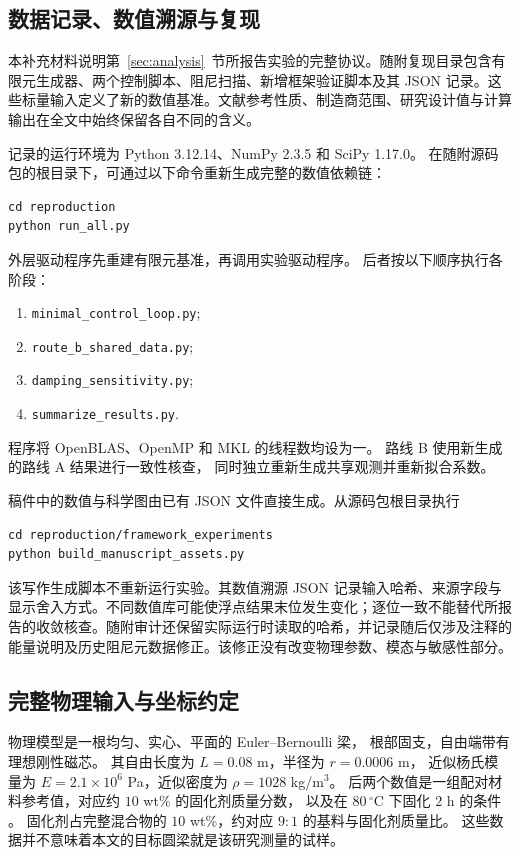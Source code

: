 \subsection{数据记录、数值溯源与复现}
\label{sx:records}
本补充材料说明第~\ref{sec:analysis}~节所报告实验的完整协议。随附复现目录包含有限元生成器、两个控制脚本、阻尼扫描、新增框架验证脚本及其 JSON 记录。这些标量输入定义了新的数值基准。文献参考性质、制造商范围、研究设计值与计算输出在全文中始终保留各自不同的含义。

记录的运行环境为 Python 3.12.14、NumPy 2.3.5 和 SciPy 1.17.0。
在随附源码包的根目录下，可通过以下命令重新生成完整的数值依赖链：
\begin{verbatim}
cd reproduction
python run_all.py
\end{verbatim}
外层驱动程序先重建有限元基准，再调用实验驱动程序。
后者按以下顺序执行各阶段：
\begin{enumerate}
\item \texttt{minimal\_control\_loop.py};
\item \texttt{route\_b\_shared\_data.py};
\item \texttt{damping\_sensitivity.py};
\item \texttt{summarize\_results.py}.
\end{enumerate}
程序将 OpenBLAS、OpenMP 和 MKL 的线程数均设为一。
路线 B 使用新生成的路线 A 结果进行一致性核查，
同时独立重新生成共享观测并重新拟合系数。

稿件中的数值与科学图由已有 JSON 文件直接生成。从源码包根目录执行
\begin{verbatim}
cd reproduction/framework_experiments
python build_manuscript_assets.py
\end{verbatim}
该写作生成脚本不重新运行实验。其数值溯源 JSON 记录输入哈希、来源字段与显示舍入方式。不同数值库可能使浮点结果末位发生变化；逐位一致不能替代所报告的收敛核查。随附审计还保留实际运行时读取的哈希，并记录随后仅涉及注释的能量说明及历史阻尼元数据修正。该修正没有改变物理参数、模态与敏感性部分。

\subsection{完整物理输入与坐标约定}
\label{sx:physical-inputs}
物理模型是一根均匀、实心、平面的 Euler--Bernoulli 梁，
根部固支，自由端带有理想刚性磁芯。
其自由长度为 $L=0.08$ m，半径为 $r=0.0006$ m，
近似杨氏模量为 $E=2.1\times10^6$ Pa，近似密度为 $\rho=1028$ kg/m$^3$。
后两个数值是一组配对材料参考值，对应约 $10$ wt\% 的固化剂质量分数，
以及在 $80\,^{\circ}$C 下固化 $2$ h 的条件 \citep{cho2021pdms}。
固化剂占完整混合物的 $10$ wt\%，约对应 $9{:}1$ 的基料与固化剂质量比。
这些数据并不意味着本文的目标圆梁就是该研究测量的试样。

